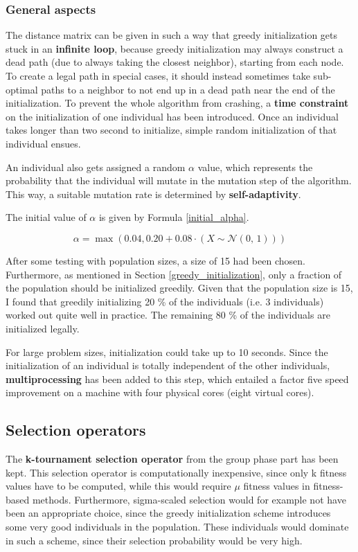 \documentclass[a4paper,10pt]{article}
\begin{document}
\subsubsection{General aspects}
\label{general_aspects_initialization}
The distance matrix can be given in such a way that greedy initialization gets stuck in an \textbf{infinite loop}, because greedy initialization may always construct a dead path (due to always taking the closest neighbor), starting from each node. To create a legal path in special cases, it should instead sometimes take sub-optimal paths to a neighbor to not end up in a dead path near the end of the initialization. To prevent the whole algorithm from crashing, a \textbf{time constraint} on the initialization of one individual has been introduced. Once an individual takes longer than two second to initialize, simple random initialization of that individual ensues.

An individual also gets assigned a random $\alpha$ value, which represents the probability that the individual will mutate in the mutation step of the algorithm. This way, a suitable mutation rate is determined by \textbf{self-adaptivity}.

The initial value of $\alpha$ is given by Formula \ref{initial_alpha}.

\begin{equation}
    \label{initial_alpha}
    \alpha = \max(0.04, 0.20+0.08 \cdot (X \sim \mathcal{N}(0,\,1)))
\end{equation}

After some testing with population sizes, a size of 15 had been chosen. Furthermore, as mentioned in Section \ref{greedy_initialization}, only a fraction of the population should be initialized greedily. Given that the  population size is 15, I found that greedily initializing 20 \% of the individuals (i.e. 3 individuals) worked out quite well in practice. The remaining 80 \% of the individuals are initialized legally.

For large problem sizes, initialization could take up to 10 seconds. Since the initialization of an individual is totally independent of the other individuals, \textbf{multiprocessing} has been added to this step, which entailed a factor five speed improvement on a machine with four physical cores (eight virtual cores).


\subsection{Selection operators}
\label{selection}
The \textbf{k-tournament selection operator} from the group phase part has been kept. This selection operator is computationally inexpensive, since only k fitness values have to be computed, while this would require $\mu$ fitness values in fitness-based methods. Furthermore, sigma-scaled selection would for example not have been an appropriate choice, since the greedy initialization scheme introduces some very good individuals in the population. These individuals would dominate in such a scheme, since their selection probability would be very high.
\end{document}
